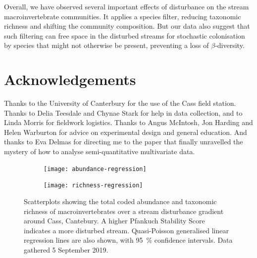 \documentclass[a4paper,10pt]{article}
\newcommand\datadate{5 September 2019} %
\begin{document}
Overall, we have observed several important effects of disturbance on the stream macroinvertebrate communities.
It applies a species filter, reducing taxonomic richness and shifting the community composition.
But our data also suggest that such filtering can free space in the disturbed streams for stochastic colonisation by species that might not otherwise be present, preventing a loss of $\beta$-diversity.

\section*{Acknowledgements}

Thanks to the University of Canterbury for the use of the Cass field station.
Thanks to Delia Teesdale and Chynae Stark for help in data collection, and to Linda Morris for fieldwork logistics.
Thanks to Angus McIntosh, Jon Harding and Helen Warburton for advice on experimental design and general education.
And thanks to Eva Delmas for directing me to the paper that finally unravelled the mystery of how to analyse semi-quantitative multivariate data.

\clearpage

\begin{figure}[p]
	\centering
	\begin{subfigure}[t]{\textwidth}
		\centering
		\texttt{[image: abundance-regression]}
		\caption{}\label{fig:abundance-regression}
	\end{subfigure}
	\begin{subfigure}[t]{\textwidth}
		\centering
		\texttt{[image: richness-regression]}
		\caption{}\label{fig:richness-regression}
	\end{subfigure}
	\caption[Regression plots]{ %
		Scatterplots showing the total coded abundance and taxonomic richness of macroinvertebrates over a stream disturbance gradient around Cass, Cantebury.
		A higher Pfankuch Stability Score indicates a more disturbed stream.
		Quasi-Poisson generalised linear regression lines are also shown, with \SI{95}{\percent} confidence intervals.
		Data gathered {\datadate}.
	}\label{fig:regressions}
\end{figure}
\end{document}
